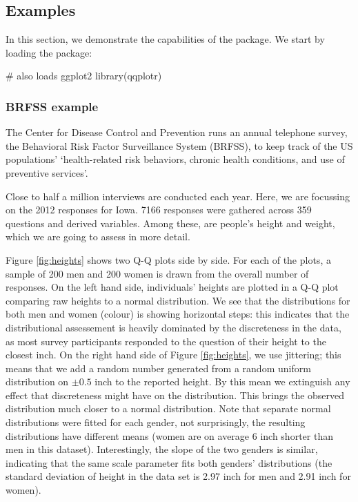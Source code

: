 \subsection{Examples}\label{examples}

\label{sec:examples}

In this section, we demonstrate the capabilities of the 
package. We start by loading the package:

\begin{Schunk}
\begin{Sinput}
# also loads ggplot2
library(qqplotr)
\end{Sinput}
\end{Schunk}

\subsubsection{BRFSS example}\label{brfss-example}

The Center for Disease Control and Prevention runs an annual telephone
survey, the Behavioral Risk Factor Surveillance System (BRFSS), to keep
track of the US populations' `health-related risk behaviors, chronic
health conditions, and use of preventive services'.

Close to half a million interviews are conducted each year. Here, we are
focussing on the 2012 responses for Iowa. 7166 responses were gathered
across 359 questions and derived variables. Among these, are people's
height and weight, which we are going to assess in more detail.

Figure \ref{fig:heights} shows two Q-Q plots side by side. For each of
the plots, a sample of 200 men and 200 women is drawn from the overall
number of responses. On the left hand side, individuals' heights are
plotted in a Q-Q plot comparing raw heights to a normal distribution. We
see that the distributions for both men and women (colour) is showing
horizontal steps: this indicates that the distributional assessement is
heavily dominated by the discreteness in the data, as most survey
participants responded to the question of their height to the closest
inch. On the right hand side of Figure \ref{fig:heights}, we use
jittering; this means that we add a random number generated from a
random uniform distribution on \(\pm 0.5\) inch to the reported height.
By this mean we extinguish any effect that discreteness might have on
the distribution. This brings the observed distribution much closer to a
normal distribution. Note that separate normal distributions were fitted
for each gender, not surprisingly, the resulting distributions have
different means (women are on average 6 inch shorter than men in this
dataset). Interestingly, the slope of the two genders is similar,
indicating that the same scale parameter fits both genders'
distributions (the standard deviation of height in the data set is 2.97
inch for men and 2.91 inch for women).


